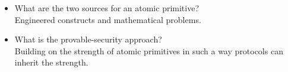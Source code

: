 \begin{itemize}
    \item What are the two sources for an atomic primitive?\\
          Engineered constructs and mathematical problems.\\

    \item What is the provable-security approach?\\
          Building on the strength of atomic primitives in such a way protocols can inherit the strength.\\
\end{itemize}


